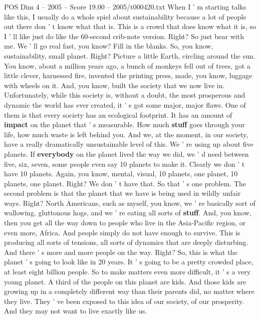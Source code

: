 \begin{textsample}{POS Dim 4 – 2005 – Score 19.00 – 2005/t000420.txt}  \label{ex:f4_pos_016}
When I ' m starting talks like this, I usually do a whole spiel about sustainability because a lot of people out there don ' t know what that is.
This is a crowd that does know what it is, so I ' ll like just do like the 60-second crib-note version.
Right?
So just bear with me.
We ' ll go real fast, you know?
Fill in the blanks.
So, you know, sustainability, small planet.
Right?
Picture a little Earth, circling around the sun.
You know, about a million years ago, a bunch of monkeys fell out of trees, got a little clever, harnessed fire, invented the printing press, made, you know, luggage with wheels on it.
And, you know, built the society that we now live in.
Unfortunately, while this society is, without a doubt, the most prosperous and dynamic the world has ever created, it ' s got some major, major flaws.
One of them is that every society has an ecological footprint.
It has an amount of \textbf{impact} on the planet that ' s measurable.
How much \textbf{stuff} goes through your life, how much waste is left behind you.
And we, at the moment, in our society, have a really dramatically unsustainable level of this.
We ' re using up about five planets.
If \textbf{everybody} on the planet lived the way we did, we ' d need between five, six, seven, some people even say 10 planets to make it.
Clearly we don ' t have 10 planets.
Again, you know, mental, visual, 10 planets, one planet, 10 planets, one planet.
Right?
We don ' t have that.
So that ' s one problem.
The second problem is that the planet that we have is being used in wildly unfair ways.
Right?
North Americans, such as myself, you know, we ' re basically sort of wallowing, gluttonous hogs, and we ' re eating all sorts of \textbf{stuff}.
And, you know, then you get all the way down to people who live in the Asia-Pacific region, or even more, Africa.
And people simply do not have enough to survive.
This is producing all sorts of tensions, all sorts of dynamics that are deeply disturbing.
And there ' s more and more people on the way.
Right?
So, this is what the planet ' s going to look like in 20 years.
It ' s going to be a pretty crowded place, at least eight billion people.
So to make matters even more difficult, it ' s a very young planet.
A third of the people on this planet are kids.
And those kids are growing up in a completely different way than their parents did, no matter where they live.
They ' ve been exposed to this idea of our society, of our prosperity.
And they may not want to live exactly like us.

\end{textsample}
